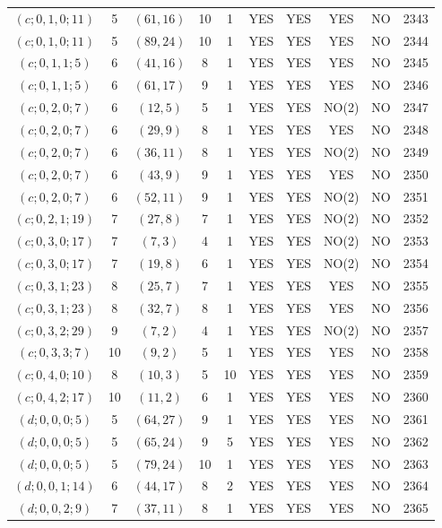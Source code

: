 \begin{longtable}{|c|c|c|c|c|c|c|c|c|c|}
$(c; 0, 1, 0; 11)$ & 5 & $(61, 16)$ & 10 & 1 & YES & YES & YES & NO & 2343\\
$(c; 0, 1, 0; 11)$ & 5 & $(89, 24)$ & 10 & 1 & YES & YES & YES & NO & 2344\\
$(c; 0, 1, 1; 5)$ & 6 & $(41, 16)$ & 8 & 1 & YES & YES & YES & NO & 2345\\
$(c; 0, 1, 1; 5)$ & 6 & $(61, 17)$ & 9 & 1 & YES & YES & YES & NO & 2346\\
$(c; 0, 2, 0; 7)$ & 6 & $(12, 5)$ & 5 & 1 & YES & YES & NO(2) & NO & 2347\\
$(c; 0, 2, 0; 7)$ & 6 & $(29, 9)$ & 8 & 1 & YES & YES & YES & NO & 2348\\
$(c; 0, 2, 0; 7)$ & 6 & $(36, 11)$ & 8 & 1 & YES & YES & NO(2) & NO & 2349\\
$(c; 0, 2, 0; 7)$ & 6 & $(43, 9)$ & 9 & 1 & YES & YES & YES & NO & 2350\\
$(c; 0, 2, 0; 7)$ & 6 & $(52, 11)$ & 9 & 1 & YES & YES & NO(2) & NO & 2351\\
$(c; 0, 2, 1; 19)$ & 7 & $(27, 8)$ & 7 & 1 & YES & YES & NO(2) & NO & 2352\\
$(c; 0, 3, 0; 17)$ & 7 & $(7, 3)$ & 4 & 1 & YES & YES & NO(2) & NO & 2353\\
$(c; 0, 3, 0; 17)$ & 7 & $(19, 8)$ & 6 & 1 & YES & YES & NO(2) & NO & 2354\\
$(c; 0, 3, 1; 23)$ & 8 & $(25, 7)$ & 7 & 1 & YES & YES & YES & NO & 2355\\
$(c; 0, 3, 1; 23)$ & 8 & $(32, 7)$ & 8 & 1 & YES & YES & YES & NO & 2356\\
$(c; 0, 3, 2; 29)$ & 9 & $(7, 2)$ & 4 & 1 & YES & YES & NO(2) & NO & 2357\\
$(c; 0, 3, 3; 7)$ & 10 & $(9, 2)$ & 5 & 1 & YES & YES & YES & NO & 2358\\
$(c; 0, 4, 0; 10)$ & 8 & $(10, 3)$ & 5 & 10 & YES & YES & YES & NO & 2359\\
$(c; 0, 4, 2; 17)$ & 10 & $(11, 2)$ & 6 & 1 & YES & YES & YES & NO & 2360\\
$(d; 0, 0, 0; 5)$ & 5 & $(64, 27)$ & 9 & 1 & YES & YES & YES & NO & 2361\\
$(d; 0, 0, 0; 5)$ & 5 & $(65, 24)$ & 9 & 5 & YES & YES & YES & NO & 2362\\
$(d; 0, 0, 0; 5)$ & 5 & $(79, 24)$ & 10 & 1 & YES & YES & YES & NO & 2363\\
$(d; 0, 0, 1; 14)$ & 6 & $(44, 17)$ & 8 & 2 & YES & YES & YES & NO & 2364\\
$(d; 0, 0, 2; 9)$ & 7 & $(37, 11)$ & 8 & 1 & YES & YES & YES & NO & 2365\\

\end{longtable}
